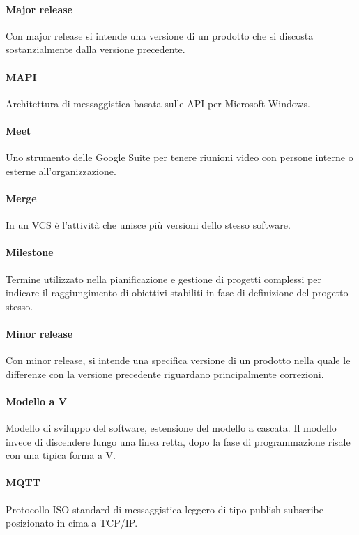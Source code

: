 \documentclass[]{article}
\begin{document}
	\paragraph*{Major release}
	Con major release si intende una versione di un prodotto che si discosta sostanzialmente dalla versione precedente.
	
	\paragraph*{MAPI}
	Architettura di messaggistica basata sulle API per Microsoft Windows.
	
	\paragraph*{Meet}
	Uno strumento delle Google Suite per tenere riunioni video con persone interne o esterne all'organizzazione.
	
	\paragraph*{Merge}
	In un VCS è l'attività che unisce più versioni dello stesso software.
	
	\paragraph*{Milestone}
	Termine utilizzato nella pianificazione e gestione di progetti complessi per indicare il raggiungimento di obiettivi stabiliti in fase di definizione del progetto stesso.
	
	\paragraph*{Minor release}
	Con minor release, si intende una specifica versione di un prodotto nella quale le differenze con la versione precedente riguardano principalmente correzioni.
	
	\paragraph*{Modello a V}
	Modello di sviluppo del software, estensione del modello a cascata. Il modello invece di discendere lungo una linea retta, dopo la fase di programmazione risale con una tipica forma a V.
	
	\paragraph*{MQTT}
	Protocollo ISO standard di messaggistica leggero di tipo publish-subscribe posizionato in cima a TCP/IP. 
	
\end{document}
